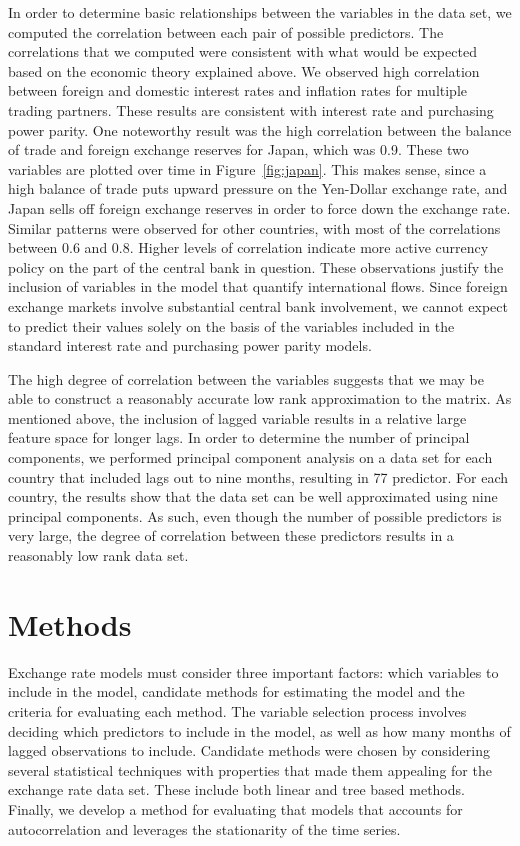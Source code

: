 \documentclass{sig-alternate-05-2015}
\begin{document}
In order to determine basic relationships between the variables in the data set, we computed the correlation between each pair of possible predictors. The correlations that we computed were consistent with what would be expected based on the economic theory explained above. We observed high correlation between foreign and domestic interest rates and inflation rates for multiple trading partners. These results are consistent with interest rate and purchasing power parity. One noteworthy result was the high correlation between the balance of trade and foreign exchange reserves for Japan, which was 0.9. These two variables are plotted over time in Figure~\ref{fig:japan}. This makes sense, since a high balance of trade puts upward pressure on the Yen-Dollar exchange rate, and Japan sells off foreign exchange reserves in order to force down the exchange rate. Similar patterns were observed for other countries, with most of the correlations between 0.6 and 0.8. Higher levels of correlation indicate more active currency policy on the part of the central bank in question. These observations justify the inclusion of variables in the model that quantify international flows. Since foreign exchange markets involve substantial central bank involvement, we cannot expect to predict their values solely on the basis of the variables included in the standard interest rate and purchasing power parity models.

The high degree of correlation between the variables suggests that we may be able to construct a reasonably accurate low rank approximation to the matrix. As mentioned above, the inclusion of lagged variable results in a relative large feature space for longer lags. In order to determine the number of principal components, we performed principal component analysis on a data set for each country that included lags out to nine months, resulting in 77 predictor. For each country, the results show that the data set can be well approximated using nine principal components. As such, even though the number of possible predictors is very large, the degree of correlation between these predictors results in a reasonably low rank data set.

\section{Methods}
Exchange rate models must consider three important factors: which variables to include in the model, candidate methods for estimating the model and the criteria for evaluating each method. The variable selection process involves deciding which predictors to include in the model, as well as how many months of lagged observations to include. Candidate methods were chosen by considering several statistical techniques with properties that made them appealing for the exchange rate data set. These include both linear and tree based methods. Finally, we develop a method for evaluating that models that accounts for autocorrelation and leverages the stationarity of the time series.
\end{document}
